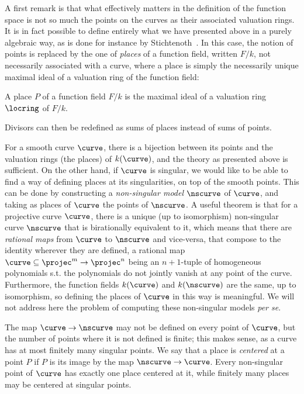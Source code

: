 A first remark is that what effectively matters in the definition of the function space is not so much the points on the curves as their associated valuation
rings. It is in fact possible to define entirely what we have presented above in a purely algebraic way, as is done for instance by Stichtenoth~\cite{stichtenoth}.
In this case, the notion of points is replaced by the one of \emph{places} of a function field, written $F/k$, not necessarily associated with a curve, where a place is simply the necessarily unique maximal
ideal of a valuation ring of the function field:

\begin{defi}
A place $P$ of a function field $F/k$ is the maximal ideal of a valuation ring $\locring$ of $F/k$. 
\end{defi}

Divisors can then be redefined as sums of places instead of sums of points.

For a smooth curve $\curve$, there is a bijection between its points and the valuation rings (the places) of $k(\curve)$, and the theory as presented above is sufficient.
On the other hand, if $\curve$ is singular, we would like to be able to find a way of defining places at its singularities, on top of the smooth points.
This can be done by constructing a \emph{non-singular model} $\nscurve$ of $\curve$,
and taking as places of $\curve$ the points of $\nscurve$. A useful theorem is that for a projective curve $\curve$, there is a unique (up to isomorphism) non-singular curve
$\nscurve$ that is birationally equivalent to it, which means that there are \emph{rational maps} from $\curve$ to $\nscurve$ and vice-versa, that compose to the identity wherever they are
defined,
a rational map $\curve \subseteq \projec^m \rightarrow \projec^n$ being an $n+1$-tuple of homogeneous polynomials s.t. the polynomials do not jointly
vanish at any point of the curve. Furthermore, the function fields $k(\curve)$ and $k(\nscurve)$ are the same, up to isomorphism, so defining the places of $\curve$ in this
way is meaningful.
We will not address here the problem of computing these non-singular models \emph{per se}.

The map $\curve \rightarrow \nscurve$ may not be defined on every point of $\curve$, but the number of points where it is not defined is finite; this makes sense, as a curve
has at most finitely many singular points. We say that a place is \emph{centered} at a point $P$ if $P$ is its image by the map $\nscurve \rightarrow \curve$.
Every non-singular
point of $\curve$ has exactly one place centered at it, while finitely many places may be centered at singular points.

